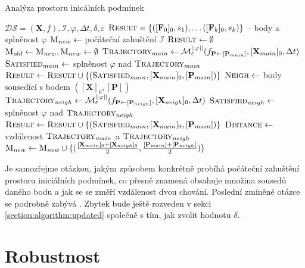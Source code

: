 \begin{algorithm}
\caption{Analýza prostoru inicálních podmínek}
\begin{algorithmic}
\Require 	$\mathcal{DS} = (\mathbf{X}, f), \mathcal{I}, \varphi, \Delta t, \delta, \varepsilon$
\Ensure 	$\textsc{Result} = \{([\mathbf{F}_0]_0, s_1), \ldots ([\mathbf{F}_k]_0, s_k)\}$ -- body a splněnost $\varphi$
\State		$\textsc{M}_{new} 	\gets $ počáteční zahuštění $\mathcal{I}$
\State		$\textsc{Result} \gets \emptyset$
	\State $\textsc{M}_{old} \gets \textsc{M}_{new}, \textsc{M}_{new} \gets \emptyset$
		\State $\textsc{Trajectory}_{main} \gets \mathcal{M}^{||\varphi||}_\varepsilon(f_{\mathbf{P} \gets [\mathbf{P}_{main}]}, [\mathbf{X}_{main}]_0, \Delta t)$
		\State $\textsc{Satisfied}_{main} \gets $ splněnost $\varphi$ nad $\textsc{Trajectory}_{main}$
		\State $\textsc{Result} \gets \textsc{Result} \cup \{(\textsc{Satisfied}_{main}, [\mathbf{X}_{main}]_0, [\mathbf{P}_{main}])\}$
		\State $\textsc{Neigh} \gets $ body sousedící s bodem $([\mathbf{X}]_0, [\mathbf{P}])$
			\State $\textsc{Trajectory}_{neigh} \gets \mathcal{M}^{||\varphi||}_\varepsilon(f_{\mathbf{P} \gets [\mathbf{P}_{neigh}]}, [\mathbf{X}_{neigh}]_0, \Delta t)$
			\State $\textsc{Satisfied}_{neigh} \gets $ splněnost $\varphi$ nad $\textsc{Trajectory}_{neigh}$
			\State $\textsc{Result} \gets \textsc{Result} \cup \{(\textsc{Satisfied}_{main}, [\mathbf{X}_{main}]_0, [\mathbf{P}_{main}])\}$
			\State $\textsc{Distance} \gets $ vzdálenost $\textsc{Trajectory}_{main}$ a $\textsc{Trajectory}_{neigh}$
				\State	$\textsc{M}_{new} \gets \textsc{M}_{new} \cup \{(\frac{[\mathbf{X}_{main}]_0 + [\mathbf{X}_{neigh}]_0}{2}, \frac{[\mathbf{P}_{main}] + [\mathbf{P}_{neigh}]}{2})\}$
			\EndIf
		\EndFor
	\EndFor
\EndWhile
\end{algorithmic}
\end{algorithm}

Je samozřejme otázkou, jakým způsobem konkrétně probíhá počáteční zahuštění prostoru
iniciálních podmínek, co přesně znamená obsahuje mno\-žina sousedů daného bodu a jak
se se změří vzdálenost dvou chování. Poslední zmíněné otázce se podrobně zabývá \cite{drazan2011}.
Zbytek bude ještě rozveden v sekci \ref{section:algorithm:updated} společně s tím,
jak zvolit hodnotu $\delta$.

\section{Robustnost}\label{section:robustness}

